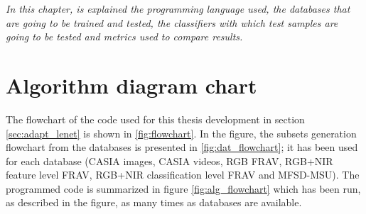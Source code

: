 
\begin{small}
\emph{In this chapter, is explained the programming language used, the databases that are going to be trained and tested, the classifiers with which test samples are going to be tested and metrics used to compare results.}
\end{small}





\section{Algorithm diagram chart}
The flowchart of the code used for this thesis development in section \ref{sec:adapt_lenet} is shown in \ref{fig:flowchart}. In the figure, the subsets generation flowchart from the databases is presented in \ref{fig:dat_flowchart}; it has been used for each database (CASIA images, CASIA videos, RGB FRAV, RGB+NIR feature level FRAV, RGB+NIR classification level FRAV and MFSD-MSU). The programmed code is summarized in figure \ref{fig:alg_flowchart} which has been run, as described in the figure, as many times as databases are available.


